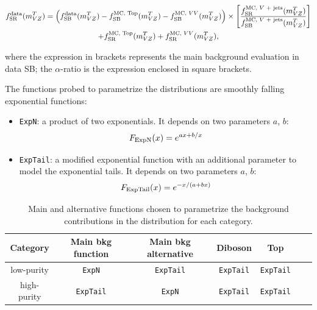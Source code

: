 \begin{equation}
\begin{gathered}
  f_{\text{SR}}^{\text{data}}(\mtVZ) = \left( f_{\text{SB}}^{\text{data}}(\mtVZ) - f_{\text{SB}}^{\text{MC, Top}}(\mtVZ) - f_{\text{SB}}^{\text{MC, \VV}}(\mtVZ) \right) \times \left[ \frac{f_{\text{SR}}^{\text{MC, \V + jets}}(\mtVZ)}{f_{\text{SB}}^{\text{MC, \V + jets}}(\mtVZ)} \right] \\
  + f_{\text{SR}}^{\text{MC, Top}}(\mtVZ) + f_{\text{SR}}^{\text{MC, \VV}}(\mtVZ), \\
\end{gathered}
\label{eq:shape_3}
\end{equation}

\noindent where the expression in brackets represents the main background evaluation in data SB; the $\alpha$-ratio is the expression enclosed in square brackets.

\noindent The functions probed to parametrize the \mtVZ distributions are smoothly falling exponential functions:

\begin{itemize}
  \item {\tt ExpN}: a product of two exponentials. It depends on two parameters $a$, $b$: $$F_{\rm ExpN}(x) = e^{ax+b/x}$$
  \item {\tt ExpTail}: a modified exponential function with an additional parameter to model the exponential tails. It depends on two parameters $a$, $b$: $$F_{\rm ExpTail}(x) = e^{-x/(a+bx)}$$
\end{itemize}

\begin{table}[!htb]
  \begin{center}
  \caption{Main and alternative functions chosen to parametrize the background contributions in the \mtVZ distribution for each category.}\label{tab:XMassFunctions}
    \begin{tabular}{c|cccccc}
      Category & Main bkg function & Main bkg alternative & Diboson & Top \\
      \hline
       \hline
       low-purity  & {\tt ExpN} & {\tt ExpTail} & {\tt ExpTail} & {\tt ExpTail} \\
      \hdashline
       high-purity  & {\tt ExpTail} & {\tt ExpN} & {\tt ExpTail} & {\tt ExpTail} \\
    \end{tabular}
  \end{center}

\end{table}

